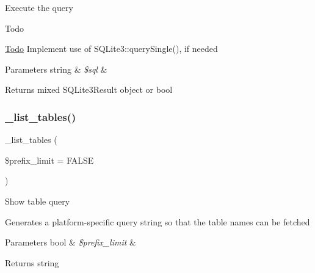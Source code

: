 Execute the query

\begin{DoxyRefDesc}{Todo}
\item[\mbox{\hyperlink{todo__todo000004}{Todo}}]Implement use of S\+Q\+Lite3\+::query\+Single(), if needed \end{DoxyRefDesc}

\begin{DoxyParams}[1]{Parameters}
string & {\em \$sql} & \\
\hline
\end{DoxyParams}
\begin{DoxyReturn}{Returns}
mixed S\+Q\+Lite3\+Result object or bool 
\end{DoxyReturn}
\mbox{\label{class_c_i___d_b__sqlite3__driver_a435c0f3ce54fe7daa178baa8532ebd54}} 
\subsubsection{\texorpdfstring{\+\_\+list\+\_\+tables()}{\_list\_tables()}}
{\footnotesize\ttfamily \+\_\+list\+\_\+tables (\begin{DoxyParamCaption}\item[{}]{\$prefix\+\_\+limit = {\ttfamily FALSE} }\end{DoxyParamCaption})\hspace{0.3cm}{\ttfamily [protected]}}

Show table query

Generates a platform-\/specific query string so that the table names can be fetched


\begin{DoxyParams}[1]{Parameters}
bool & {\em \$prefix\+\_\+limit} & \\
\hline
\end{DoxyParams}
\begin{DoxyReturn}{Returns}
string 
\end{DoxyReturn}
\mbox{\label{class_c_i___d_b__sqlite3__driver_ae0adf73984daf2d42ad29b66c484c82b}} 
